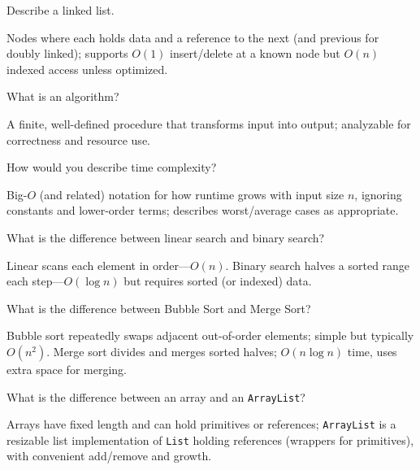 \question[4]
Describe a linked list.
\begin{solutionorbox}[1.35in]
  Nodes where each holds data and a reference to the next (and previous for doubly linked); supports \(O(1)\) insert/delete at a known node but \(O(n)\) indexed access unless optimized.
\end{solutionorbox}

\question[4]
What is an algorithm?
\begin{solutionorbox}[1.05in]
  A finite, well-defined procedure that transforms input into output; analyzable for correctness and resource use.
\end{solutionorbox}

\question[4]
How would you describe time complexity?
\begin{solutionorbox}[1.35in]
  Big-\(O\) (and related) notation for how runtime grows with input size \(n\), ignoring constants and lower-order terms; describes worst/average cases as appropriate.
\end{solutionorbox}

\question[4]
What is the difference between linear search and binary search?
\begin{solutionorbox}[1.35in]
  Linear scans each element in order---\(O(n)\). Binary search halves a sorted range each step---\(O(\log n)\) but requires sorted (or indexed) data.
\end{solutionorbox}

\question[4]
What is the difference between Bubble Sort and Merge Sort?
\begin{solutionorbox}[1.45in]
  Bubble sort repeatedly swaps adjacent out-of-order elements; simple but typically \(O(n^2)\). Merge sort divides and merges sorted halves; \(O(n\log n)\) time, uses extra space for merging.
\end{solutionorbox}



\question[4]
What is the difference between an array and an \texttt{ArrayList}?
\begin{solutionorbox}[1.45in]
  Arrays have fixed length and can hold primitives or references; \texttt{ArrayList} is a resizable list implementation of \texttt{List} holding references (wrappers for primitives), with convenient add/remove and growth.
\end{solutionorbox}

